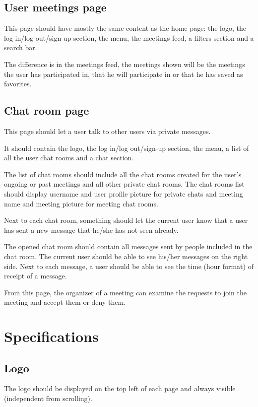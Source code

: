 \documentclass[conference]{IEEEtran}
\begin{document}
\subsection{User meetings page}

This page should have mostly the same content as the home page: the logo, the log in/log out/sign-up section, the menu, the meetings feed, a filters section and a search bar.

The difference is in the meetings feed, the meetings shown will be the meetings the user has participated in, that he will participate in or that he has saved as favorites.

\subsection{Chat room page}

This page should let a user talk to other users via private messages.

It should contain the logo, the log in/log out/sign-up section, the menu, a list of all the user chat rooms and a chat section. 

The list of chat rooms should include all the chat rooms created for the user's ongoing or past meetings and all other private chat rooms.
The chat rooms list should display username and user profile picture for private chats and meeting name and meeting picture for meeting chat rooms. 

Next to each chat room, something should let the current user know that a user has sent a new message that he/she has not seen already.

The opened chat room should contain all messages sent by people included in the chat room. 
The current user should be able to see his/her messages on the right side. 
Next to each message, a user should be able to see the time (hour format) of receipt of a message.

From this page, the organizer of a meeting can examine the requests to join the meeting and accept them or deny them.

\section{Specifications}

\subsection{Logo}

The logo should be displayed on the top left of each page and always visible (independent from scrolling).
\end{document}
